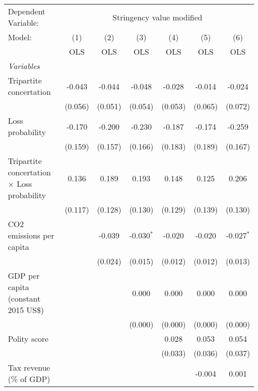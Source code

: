
\begingroup
\centering
\begin{tabular}{lcccccc}
   \toprule
   Dependent Variable: & \multicolumn{6}{c}{Stringency value modified}\\
   Model:                                             & (1)     & (2)     & (3)          & (4)     & (5)     & (6)\\  
                                                      &  OLS    & OLS     & OLS          & OLS     & OLS     & OLS\\  
   \midrule
   \emph{Variables}\\
   Tripartite concertation                            & -0.043  & -0.044  & -0.048       & -0.028  & -0.014  & -0.024\\   
                                                      & (0.056) & (0.051) & (0.054)      & (0.053) & (0.065) & (0.072)\\   
   Loss probability                                   & -0.170  & -0.200  & -0.230       & -0.187  & -0.174  & -0.259\\   
                                                      & (0.159) & (0.157) & (0.166)      & (0.183) & (0.189) & (0.167)\\   
   Tripartite concertation $\times$ Loss probability  & 0.136   & 0.189   & 0.193        & 0.148   & 0.125   & 0.206\\   
                                                      & (0.117) & (0.128) & (0.130)      & (0.129) & (0.139) & (0.130)\\   
   CO2 emissions per capita                           &         & -0.039  & -0.030$^{*}$ & -0.020  & -0.020  & -0.027$^{*}$\\   
                                                      &         & (0.024) & (0.015)      & (0.012) & (0.012) & (0.013)\\   
   GDP per capita (constant 2015 US\$)                &         &         & 0.000        & 0.000   & 0.000   & 0.000\\   
                                                      &         &         & (0.000)      & (0.000) & (0.000) & (0.000)\\   
   Polity score                                       &         &         &              & 0.028   & 0.053   & 0.054\\   
                                                      &         &         &              & (0.033) & (0.036) & (0.037)\\   
   Tax revenue (\% of GDP)                            &         &         &              &         & -0.004  & 0.001\\   

\end{tabular}
